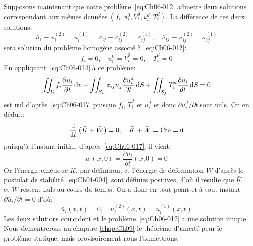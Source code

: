 Supposons maintenant que notre problème~\eqref{eq:Ch06-012} admette deux solutions correspondant aux mêmes données $\left( f_i, u_i^0, V_i^0, u_i^d, T_i^d \right)$.
La différence de ces deux solutions:
\begin{equation}
    \bar{u}_i = u_i^{(2)} - u_i^{(1)}, \quad \bar{\varepsilon}_{ij} = \varepsilon_{ij}^{(2)} - \varepsilon_{ij}^{(1)}, \quad  \bar{\sigma}_{ij} = \sigma_{ij}^{(2)} - \sigma_{ij}^{(1)}
    \label{eq:Ch06-016}
\end{equation}
sera solution du problème homogène associé à~\eqref{eq:Ch06-012}:
\begin{equation}
    \bar{f}_i = 0, \quad \bar{u}_i^0 = \bar{V}_i^0 = 0, \quad \bar{T}_i^d= 0
    \label{eq:Ch06-017}
\end{equation}
En appliquant~\eqref{eq:Ch06-014} à ce problème:
\begin{equation}
    \iint_{\Omega} \bar{f}_i \frac{\partial \bar{u}_i}{\partial t} \mathop{\mathrm{{}d}}\mathopen{} v + \iint_{S_u} \bar{\sigma_{ij}} n_j \frac{\partial \bar{u}_i^d}{\partial t} \mathop{\mathrm{{}d}}\mathopen{} S + \iint_{S_f} \bar{T}_i^d \frac{\partial \bar{u}_i}{\partial t} \mathop{\mathrm{{}d}}\mathopen{} S = 0
    \label{eq:Ch06-018}
\end{equation}
est nul d'après~\eqref{eq:Ch06-017} puisque $\bar{f}_i$, $\bar{T}_i^d$ et $\bar{u}_i^d$ et donc $\partial \bar{u}_i^d/\partial t$ sont nuls.
On en déduit:
\begin{equation}
    \frac{\mathop{\mathrm{{}d}}\mathopen{}}{\mathop{\mathrm{{}d}}\mathopen{} t} \left( \bar{K} + \bar{W} \right) = 0, \quad \bar{K} + \bar{W} = \text{Cte} = 0
    \label{eq:Ch06-019}
\end{equation}
puisqu'à l'instant initial, d'après~\eqref{eq:Ch06-017}, il vient:
\begin{equation}
    \bar{u}_i \left( x,0 \right) = \frac{\partial \bar{u}_i}{\partial t} \left( x,0 \right) = 0
    \label{eq:Ch06-020}
\end{equation}
Or l'énergie cinétique $K$, par définition, et l'énergie de déformation $W$ d'après le postulat de stabilité~\eqref{eq:Ch04-004}, sont définies positives, d'où il résulte que $\bar{K}$ et $\bar{W}$ restent nuls au cours du temps.
On a donc en tout point et à tout instant $\partial \bar{u}_i/\partial t = 0$ d'où:
\begin{equation}
    \bar{u}_i \left( x,t \right) = 0, \quad u_i^{(2)} \left( x,t \right) = u_i^{(1)} \left( x,t \right)
    \label{eq:Ch06-021}
\end{equation}
Les deux solutions coïncident et le problème~\eqref{eq:Ch06-012} a une solution unique.
Nous démontrerons au chapitre \ref{chap:Ch09} le théorème d'unicité peur le problème statique, mais provisoirement nous l'admettrons.

